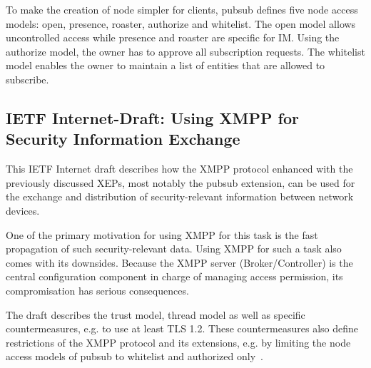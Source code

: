 To make the creation of node simpler for clients, \gls{pubsub} defines five node access models: open, presence, roaster, authorize and whitelist.
The open model allows uncontrolled access while presence and roaster are specific for IM. Using the authorize model, the owner has to approve all subscription requests. The whitelist model enables the owner to maintain a list of entities that are allowed to subscribe.


\subsection{IETF Internet-Draft: Using XMPP for Security Information Exchange}
This IETF Internet draft describes how the XMPP protocol enhanced with the previously discussed XEPs, most notably the \gls{pubsub} extension, can be used for the exchange and distribution of security-relevant information between network devices.

One of the primary motivation for using XMPP for this task is the fast propagation of such security-relevant data.
Using XMPP for such a task also comes with its downsides. Because the XMPP server (Broker/Controller) is the central configuration component in charge of managing access permission, its compromisation has serious consequences.

The draft describes the trust model, thread model as well as specific countermeasures, e.g. to use at least TLS 1.2. These countermeasures also define restrictions of the XMPP protocol and its extensions, e.g. by limiting the node access models of \gls{pubsub} to whitelist and authorized only~\cite{ietf-mile-xmpp-grid-05}.
